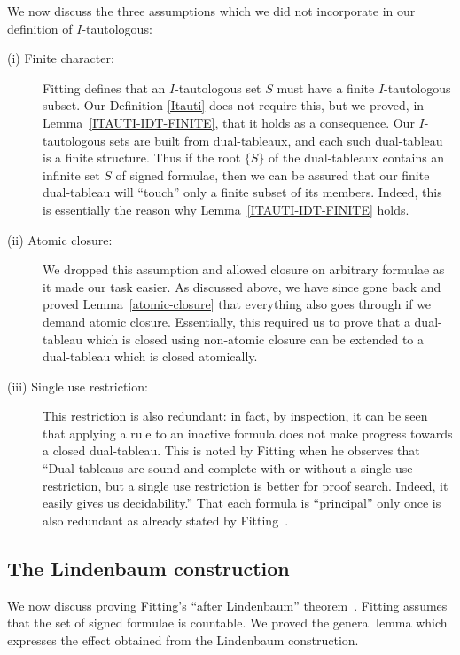 \documentclass[a4paper]{article}
\begin{document}
We now discuss the three assumptions which we did not incorporate
in our definition of $I$-tautologous:
\begin{description}
\item[\rm (i) Finite character:] Fitting defines that an $I$-tautologous
  set $S$ must have a finite $I$-tautologous subset.
  Our Definition \ref{Itauti} does not require this, but we proved,
  in Lemma~\ref{ITAUTI-IDT-FINITE}, that it holds as a consequence.
  Our $I$-tautologous sets are built from dual-tableaux, and each
  such dual-tableau is a finite structure. Thus if the root $\{S\}$ of the
  dual-tableaux contains an infinite set $S$ of signed formulae, then we
  can be assured that our finite dual-tableau will ``touch'' only a
  finite subset of its members. Indeed, this is essentially the reason
  why Lemma~\ref{ITAUTI-IDT-FINITE} holds.
\item[\rm (ii) Atomic closure:] We dropped this assumption and allowed
  closure on arbitrary formulae as it made our task easier.
  As discussed above, we have
  since gone back and proved Lemma~\ref{atomic-closure} that
  everything also goes through if we demand atomic
  closure. Essentially, this required us to prove that a dual-tableau
  which is closed using non-atomic closure can be extended to a
  dual-tableau which is closed atomically.
\item[\rm (iii) Single use restriction:] This restriction is also
  redundant: in fact, by inspection, it can be seen that applying a
  rule to an inactive formula does not make progress towards a closed
  dual-tableau.  This is noted by Fitting when he observes that ``Dual
  tableaus are sound and complete with or without a single use
  restriction, but a single use restriction is better for proof
  search. Indeed, it easily gives us decidability.''  That each
  formula is ``principal'' only once is also redundant as already
  stated by Fitting~\cite[just after his Definition~2]{fitting-dual-tableau}.
\end{description}

\subsection{The Lindenbaum construction}

We now discuss proving Fitting's ``after
Lindenbaum'' theorem~\cite[Theorem~1]{fitting-dual-tableau}. 
Fitting assumes that the
set of signed formulae is countable.
%
We proved the general lemma which expresses 
the effect obtained from the Lindenbaum construction.
\end{document}
